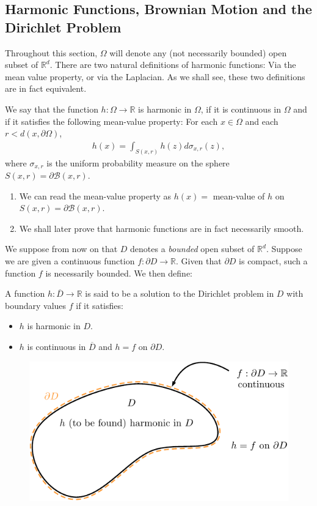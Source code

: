 \documentclass[../mainfile.tex]{subfiles}
\begin{document}
\subsection{Harmonic Functions, Brownian Motion and the Dirichlet Problem}
Throughout this section, $\Omega$ will denote any (not necessarily bounded) open subset of $\mathbb{R}^d$. There are two natural definitions of harmonic functions: Via the mean value property, or via the Laplacian. As we shall see, these two definitions are in fact equivalent. 
\begin{defn} We say that the function $h: \Omega \to \mathbb{R}$ is harmonic in $\Omega$, if it is continuous in $\Omega$ and if it satisfies the following mean-value property: For each $x \in \Omega$ and each $r < d(x, \partial \Omega)$, 
\begin{align*}
h(x) = \int_{S(x,r)} h(z) d \sigma_{x,r}(z),
\end{align*}
where $\sigma_{x,r}$ is the uniform probability measure on the sphere $S(x,r)= \partial \mathcal{B}(x,r)$. 
\end{defn}
\begin{rem} 
\begin{enumerate}
\item We can read the mean-value property as $h(x)=$ mean-value of $h$ on $S(x,r)= \partial \mathcal{B}(x,r)$. 
\item We shall later prove that harmonic functions are in fact necessarily smooth. 
\end{enumerate}
\end{rem}
We suppose from now on that $D$ denotes a \textit{bounded} open subset of $\mathbb{R}^d$. Suppose we are given a continuous function $f: \partial D \to \mathbb{R}$. Given that $\partial D$ is compact, such a function $f$ is necessarily bounded. We then define:
\begin{defn}A function $h: \overline{D} \to \mathbb{R}$ is said to be a solution to the Dirichlet problem in $D$ with boundary values $f$ if it satisfies:
\begin{itemize}
\item $h$ is harmonic in $D$.
\item $h$ is continuous in $\overline{D}$ and $h=f$ on $\partial D$. 
\end{itemize}
\end{defn}
\begin{figure}[hbtp]
\centering
\includegraphics[scale=.86]{dirichletprob.pdf}
\end{figure}
\end{document}
